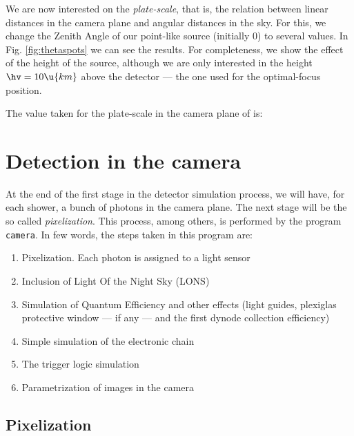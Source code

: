 We are now interested on the \emph{plate-scale}, that is, the relation
between linear distances in the camera plane and angular distances in
the sky. For this, we change the Zenith Angle of our point-like source
(initially 0\deg) to several values. In Fig. \ref{fig:thetaspots} we
can see the results. For completeness, we show the effect of the
height of the source, although we are only interested in the height
$\hv=10\u{km}$ above the detector --- the one used for the
optimal-focus position.

The value taken for the plate-scale in the camera plane of \MAGIC is:
%
\platescaleeq

\section{Detection in the camera}

At the end of the first stage in the detector simulation process, we
will have, for each shower, a bunch of photons in the camera plane.
The next stage will be the so called \emph{pixelization}.  This
process, among others, is performed by the program \texttt{camera}. In
few words, the steps taken in this program are:

\begin{enumerate}
\item Pixelization. Each photon is assigned to a light sensor
  
\item Inclusion of Light Of the Night Sky (LONS)
  
\item Simulation of Quantum Efficiency and other effects (light
  guides, plexiglas protective window --- if any --- and the first
  dynode collection efficiency)

\item Simple simulation of the electronic chain

\item The trigger logic simulation
  
\item Parametrization of images in the camera
\end{enumerate}

\zonesfig


\subsection{Pixelization}

